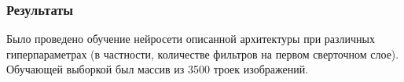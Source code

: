 \documentclass[12pt]{beamer}
\begin{document}
\begin{frame}\frametitle{Результаты}
	Было проведено обучение нейросети описанной архитектуры при различных гиперпараметрах (в частности, количестве фильтров на первом сверточном слое). Обучающей выборкой был массив из 3500 троек изображений.
	\begin{figure}
		\begin{columns}
				\begin{minipage}{1\linewidth}
				\end{minipage}
				\vfill
				\begin{minipage}{1\linewidth}
				\end{minipage}
				\begin{minipage}{1\linewidth}

\end{minipage}
\end{columns}
\end{figure}
\end{frame}
\end{document}
